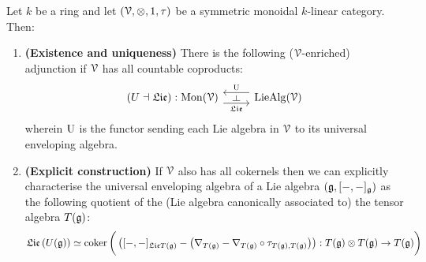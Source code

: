     \begin{theorem} \label{theorem: universal_enveloping_algebras_universal_property}
         Let $k$ be a ring and let $(\calV, \tensor, 1, \tau)$ be a symmetric monoidal $k$-linear category. Then:
            \begin{enumerate}
                \item \textbf{(Existence and uniqueness)} There is the following ($\mathcal{V}$-enriched) adjunction if $\mathcal{V}$ has all countable coproducts:
                    $$
                        \begin{tikzcd}
                        	{(U \ladjoint \frakLie): \Mon(\calV)} & {\Lie\Alg(\calV)}
                        	\arrow["{\frakLie}"{name=0, swap}, from=1-1, to=1-2, shift right=2]
                        	\arrow["{\U}"{name=1, swap}, from=1-2, to=1-1, shift right=2]
                        	\arrow["\dashv"{rotate=-90}, from=1, to=0, phantom]
                        \end{tikzcd}
                    $$
                wherein $\mathrm{U}$ is the functor sending each Lie algebra in $\mathcal{V}$ to its universal enveloping algebra.
                \item \textbf{(Explicit construction)} If $\mathcal{V}$ also has all cokernels then we can explicitly characterise the universal enveloping algebra of a Lie algebra $\left(\mathfrak{g}, [-,-]_{\mathfrak{g}}\right)$ as the following quotient of the (Lie algebra canonically associated to) the tensor algebra $T(\mathfrak{g})$:
                    $$\frakLie\left(U(\g)\right) \cong \coker \bigg(\left([-,-]_{\frakLie T(\g)} - \left(\nabla_{T(\g)} - \nabla_{T(\g)} \circ \tau_{T(\g), T(\g)}\right)\right): T(\g) \tensor T(\g) \to T(\g)\bigg)$$
            \end{enumerate}
    \end{theorem}
